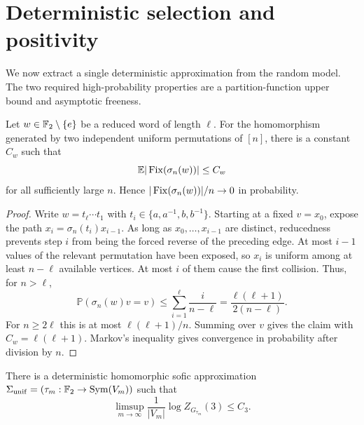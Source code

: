 \section{Deterministic selection and positivity}\label{sec:selection}

We now extract a single deterministic approximation from the random model.
The two required high-probability properties are a partition-function upper
bound and asymptotic freeness.

\begin{lemma}\label{lem:exposure}
Let $w\in\mathbb F_2\setminus\{e\}$ be a reduced word of length $\ell$.  For the
homomorphism generated by two independent uniform permutations of $[n]$,
there is a constant $C_w$ such that
\[
 \mathbb E|\operatorname{Fix}(\sigma_n(w))|\le C_w
\]
for all sufficiently large $n$.  Hence
$|\operatorname{Fix}(\sigma_n(w))|/n\to0$ in probability.
\end{lemma}

\begin{proof}
Write $w=t_\ell\cdots t_1$ with
$t_i\in\{a,a^{-1},b,b^{-1}\}$.  Starting at a fixed $v=x_0$, expose the path
$x_i=\sigma_n(t_i)x_{i-1}$.  As long as $x_0,\ldots,x_{i-1}$ are distinct,
reducedness prevents step $i$ from being the forced reverse of the preceding
edge.  At most $i-1$ values of the relevant permutation have been exposed,
so $x_i$ is uniform among at least $n-\ell$ available vertices.  At most $i$
of them cause the first collision.  Thus, for $n>\ell$,
\[
 \mathbb P(\sigma_n(w)v=v)
 \le\sum_{i=1}^\ell\frac{i}{n-\ell}
 =\frac{\ell(\ell+1)}{2(n-\ell)}.
\]
For $n\ge2\ell$ this is at most $\ell(\ell+1)/n$.  Summing over $v$ gives the
claim with $C_w=\ell(\ell+1)$.  Markov's inequality gives convergence in
probability after division by $n$.
\end{proof}

\begin{proposition}\label{prop:selection}
There is a deterministic homomorphic sofic approximation
$\Sigma_{\mathrm{unif}}=(\tau_m:\mathbb F_2\to\operatorname{Sym}(V_m))$ such that
\begin{equation}\label{eq:upper-selected}
 \limsup_{m\to\infty}\frac1{|V_m|}
 \log Z_{G_{\tau_m}}(3)\le C_3.
\end{equation}
\end{proposition}

